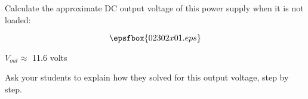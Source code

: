 

Calculate the approximate DC output voltage of this power supply when it is not loaded:

$$\epsfbox{02302x01.eps}$$







$V_{out} \approx$ 11.6 volts







Ask your students to explain how they solved for this output voltage, step by step.




